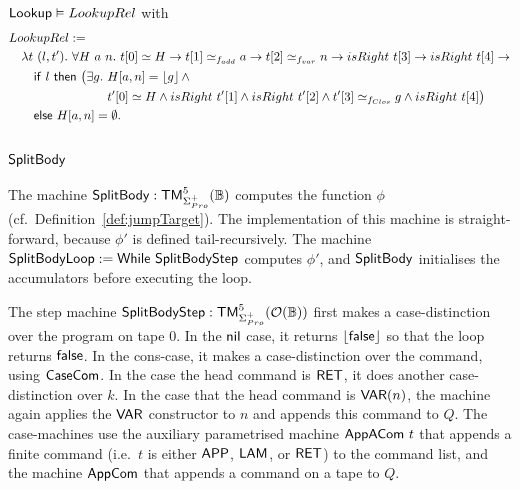 \begin{lemma}
  \label{lem:Lookup_Realise}
  $\mathsf{Lookup} \mathrel{\vDash} LookupRel$
  with
  \small
  \begin{alignat*}{1}
    & LookupRel := \\
    &\quad \lambda t~(l, t').~\forall H~a~n.~ t[0] \simeq H \rightarrow t[1] \simeq_{f_{add}} a \rightarrow t[2] \simeq_{f_{var}} n \rightarrow isRight~t[3] \rightarrow isRight~t[4] \rightarrow \\
    &\quad\quad \MS{if}~l~\MS{then}~\bigl(\exists g.~H[a,n] = \Some{g} \land \\
    &\quad\quad \phantom{\MS{if}~l~\MS{then}~\bigl(\exists g.~} t'[0] \simeq H \land isRight~t'[1] \land isRight~t'[2] \land t'[3] \simeq_{f_{Clos}} g \land isRight~t[4]\bigr) \\
    &\quad\quad \MS{else}~ H[a,n] = \None.
\end{alignat*}
\end{lemma}


\subsection{$\mathsf{SplitBody}$}
\label{sec:SplitBody}
%

The machine $\mathsf{SplitBody} : \mathsf{TM}_{\Sigma^+_{Pro}}^5(\mathbb{B})$ computes the function $\phi$ (cf.\ Definition~\ref{def:jumpTarget}).  The
implementation of this machine is straight-forward, because $\phi'$ is defined tail-recursively.  The machine
$\mathsf{SplitBodyLoop} := \mathsf{While}~\mathsf{SplitBodyStep}$ computes $\phi'$, and $\mathsf{SplitBody}$ initialises the accumulators before executing the loop.

The step machine $\mathsf{SplitBodyStep} : \mathsf{TM}_{\Sigma^+_{Pro}}^5(\mathcal{O}(\mathbb{B}))$ first makes a case-distinction over the program on tape $0$.  In the
$\mathsf{nil}$ case, it returns $\left\lfloor {\ensuremath{\mathsf{false}}} \right\rfloor$ so that the loop returns $\mathsf{false}$.  In the cons-case, it makes a case-distinction over the command, using
$\mathsf{CaseCom}$.  In the case the head command is $\mathsf{RET}$, it does another case-distinction over $k$.  In the case that the head command is
$\mathsf{VAR}(n)$, the machine again applies the $\mathsf{VAR}$ constructor to $n$ and appends this command to $Q$.  The case-machines use the auxiliary
parametrised machine $\mathsf{AppACom}~t$ that appends a finite command (i.e.\ $t$ is either $\mathsf{APP}$, $\mathsf{LAM}$, or $\mathsf{RET}$) to the command list,
and the machine $\mathsf{AppCom}$ that appends a command on a tape to $Q$.


